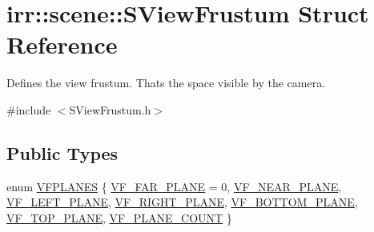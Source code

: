 \hypertarget{structirr_1_1scene_1_1SViewFrustum}{}\section{irr\+:\+:scene\+:\+:S\+View\+Frustum Struct Reference}
\label{structirr_1_1scene_1_1SViewFrustum}


Defines the view frustum. That\textquotesingle{}s the space visible by the camera.  




{\ttfamily \#include $<$S\+View\+Frustum.\+h$>$}

\subsection*{Public Types}
\begin{DoxyCompactItemize}
\item 
enum \hyperlink{structirr_1_1scene_1_1SViewFrustum_ae3a96797aec028717f0589e82926b9f0}{V\+F\+P\+L\+A\+N\+ES} \{ \newline
\hyperlink{structirr_1_1scene_1_1SViewFrustum_ae3a96797aec028717f0589e82926b9f0a33c11636c0cf3a29df16551fb3222f89}{V\+F\+\_\+\+F\+A\+R\+\_\+\+P\+L\+A\+NE} = 0, 
\hyperlink{structirr_1_1scene_1_1SViewFrustum_ae3a96797aec028717f0589e82926b9f0ad4e37002c2f3f5c9aa7219ca74ffb48e}{V\+F\+\_\+\+N\+E\+A\+R\+\_\+\+P\+L\+A\+NE}, 
\hyperlink{structirr_1_1scene_1_1SViewFrustum_ae3a96797aec028717f0589e82926b9f0a4d611f15cd215819287e533b45715d5c}{V\+F\+\_\+\+L\+E\+F\+T\+\_\+\+P\+L\+A\+NE}, 
\hyperlink{structirr_1_1scene_1_1SViewFrustum_ae3a96797aec028717f0589e82926b9f0acc02c8b170e35f1416f1511646b051aa}{V\+F\+\_\+\+R\+I\+G\+H\+T\+\_\+\+P\+L\+A\+NE}, 
\newline
\hyperlink{structirr_1_1scene_1_1SViewFrustum_ae3a96797aec028717f0589e82926b9f0aa230be71193da774ddcb735ec7b10dd1}{V\+F\+\_\+\+B\+O\+T\+T\+O\+M\+\_\+\+P\+L\+A\+NE}, 
\hyperlink{structirr_1_1scene_1_1SViewFrustum_ae3a96797aec028717f0589e82926b9f0adc6f550cf3890b19837cd8f0d7b1020a}{V\+F\+\_\+\+T\+O\+P\+\_\+\+P\+L\+A\+NE}, 
\hyperlink{structirr_1_1scene_1_1SViewFrustum_ae3a96797aec028717f0589e82926b9f0a6c3c4cb8060a23a2365cf1df46fcefd7}{V\+F\+\_\+\+P\+L\+A\+N\+E\+\_\+\+C\+O\+U\+NT}
 \}
\end{DoxyCompactItemize}
